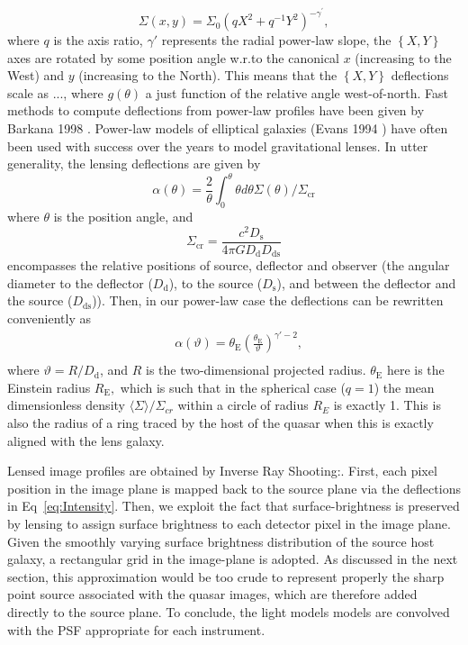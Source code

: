 \documentclass[a4paper,11pt]{article}
\begin{document}
\begin{equation}
\Sigma(x,y)=\Sigma_{0}(q X^{2}+q^{-1}Y^{2})^{-\gamma^{\prime}},
\end{equation}
%
where $q$ is the axis ratio, $\gamma'$ represents the radial power-law
slope, the $\left\{X,Y\right\}$ axes are rotated by some position
angle w.r.to the canonical $x$ (increasing to the West) and $y$
(increasing to the North). This means that the $\left\{X,Y\right\}$
deflections scale as ..., where $g(\theta)$ a just function of the
relative angle west-of-north. Fast methods to compute deflections from
power-law profiles have been given by Barkana 1998
\cite{1998ApJ...502..531B}. Power-law models of elliptical galaxies
(Evans 1994 \cite{1994MNRAS.267..333E}) have often been used with
success over the years to model gravitational lenses. In utter
generality, the lensing deflections are given by
%
\begin{equation}
\alpha(\theta) = \frac{2}{\theta} \int_{0}^{\theta} \theta d\theta \Sigma (\theta) /\Sigma_{\mathrm{cr}}
\end{equation}
%
where $\theta$ is the position angle, and 
%
\begin{equation}
\Sigma_{\mathrm{cr}} = \frac{c^{2}D_{\mathrm{s}}}{4\pi G D_{\mathrm{d}} D_{\mathrm{ds}}}
\end{equation}
%
encompasses the relative positions of source, deflector and observer
(the angular diameter to the deflector ($D_{\mathrm{d}}$), to the
source ($D_{\mathrm{s}}$), and between the deflector and the source
($D_{\mathrm{ds}}$)). Then, in our power-law case the deflections can
be rewritten conveniently as
%
\begin{eqnarray}
   \label{eq:Intensity}
   &\alpha(\vartheta) = \theta_{\mathrm{E}}\left(\frac{\theta_{\mathrm{E}}}{\vartheta}\right)^{\gamma'-2} ,\\  
\end{eqnarray}
%
where $\vartheta = R/D_{\mathrm{d}}$, and $R$ is the two-dimensional
projected radius. $\theta_{\mathrm{E}}$ here is the Einstein radius
$R_{\mathrm{E}},$ which is such that in the spherical case ($q=1$) the
mean dimensionless density $\langle\Sigma\rangle/\Sigma_{cr}$ within a
circle of radius $R_E$ is exactly 1. This is also the radius of a ring
traced by the host of the quasar when this is exactly aligned with the
lens galaxy.

Lensed image profiles are obtained by Inverse Ray Shooting:. First,
each pixel position in the image plane is mapped back to the source
plane via the deflections in Eq~\ref{eq:Intensity}. Then, we exploit
the fact that surface-brightness is preserved by lensing to assign
surface brightness to each detector pixel in the image plane. Given
the smoothly varying surface brightness distribution of the source
host galaxy, a rectangular grid in the image-plane is adopted. As
discussed in the next section, this approximation would be too crude
to represent properly the sharp point source associated with the
quasar images, which are therefore added directly to the source
plane. To conclude, the light models models are convolved with the PSF
appropriate for each instrument.
\end{document}
